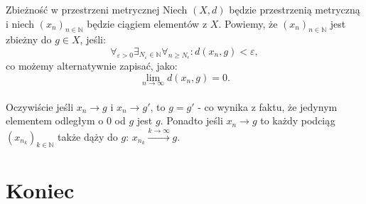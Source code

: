 \documentclass{article}
\newcommand{\N}{\mathbb{N}}
\newcommand{\oo}{\infty}
\begin{document}
    \begin{defr}{Zbieżność w przestrzeni metrycznej}
        Niech $(X, d)$ będzie przestrzenią metryczną i niech $(x_n)_{n \in \N}$ będzie ciągiem elementów z $X$. Powiemy, że $(x_n)_{n \in \N}$ jest zbieżny do $g \in X$, jeśli:
        \begin{equation}
            \forall_{\varepsilon > 0} \exists_{N_\varepsilon \in \N}\forall_{n \geqslant N_\epsilon}: d(x_n, g) < \varepsilon,
        \end{equation}
        co możemy alternatywnie zapisać, jako:
        \begin{equation}
            \lim_{n \to \oo} d(x_n, g) = 0.
        \end{equation}
    \end{defr}
    \paragraph{} Oczywiście jeśli $x_n \to g$ i $x_n \to g'$, to $g = g'$ - co wynika z faktu, że jedynym elementem odległym o 0 od $g$ jest $g$. Ponadto jeśli $x_n \to g$ to każdy podciąg $(x_{n_k})_{k \in \N}$ także dąży do $g$: $x_{n_k} \xrightarrow{k \to \oo} g$.




\section*{Koniec}
\tableofcontents
\end{document}
